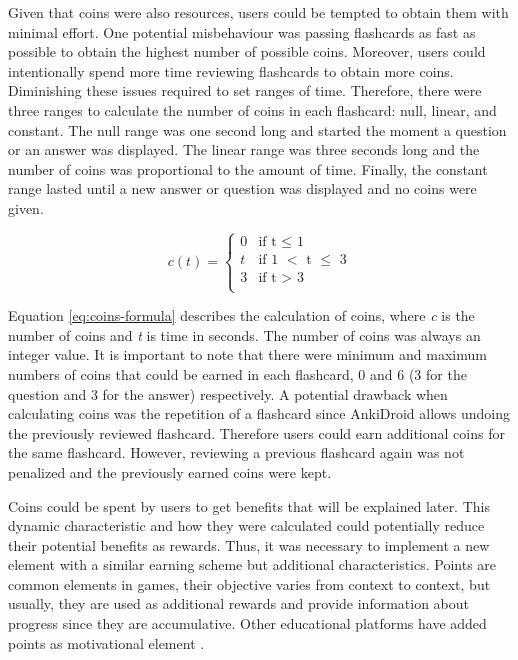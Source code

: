 Given that coins were also resources, users could be tempted to obtain them with minimal effort. One potential misbehaviour was passing flashcards as fast as possible to obtain the highest number of possible coins. Moreover, users could intentionally spend more time reviewing flashcards to obtain more coins. Diminishing these issues required to set ranges of time. Therefore, there were three ranges to calculate the number of coins in each flashcard: null, linear, and constant. The null range was one second long and started the moment a question or an answer was displayed. The linear range was three seconds long and the number of coins was proportional to the amount of time. Finally, the constant range lasted until a new answer or question was displayed and no coins were given.

\begin{equation}
  c(t) =
      \begin{cases}
        0 & \text{if t $\leq$ 1}\\
        t & \text{if 1 $<$ t $\leq$ 3}\\
        3 & \text{if t $>$ 3}\\
      \end{cases}
    \label{eq:coins-formula}
\end{equation}

Equation \ref{eq:coins-formula} describes the calculation of coins, where \textit{c} is the number of coins and \textit{t} is time in seconds. The number of coins was always an integer value. It is important to note that there were minimum and maximum numbers of coins that could be earned in each flashcard, 0 and 6 (3 for the question and 3 for the answer) respectively. A potential drawback when calculating coins was the repetition of a flashcard since AnkiDroid allows undoing the previously reviewed flashcard. Therefore users could earn additional coins for the same flashcard. However, reviewing a previous flashcard again was not penalized and the previously earned coins were kept.

Coins could be spent by users to get benefits that will be explained later. This dynamic characteristic and how they were calculated could potentially reduce their potential benefits as rewards. Thus, it was necessary to implement a new element with a similar earning scheme but additional characteristics. Points are common elements in games, their objective varies from context to context, but usually, they are used as additional rewards and provide information about progress since they are accumulative. Other educational platforms have added points as motivational element \citep{disalvo2014khan}.

